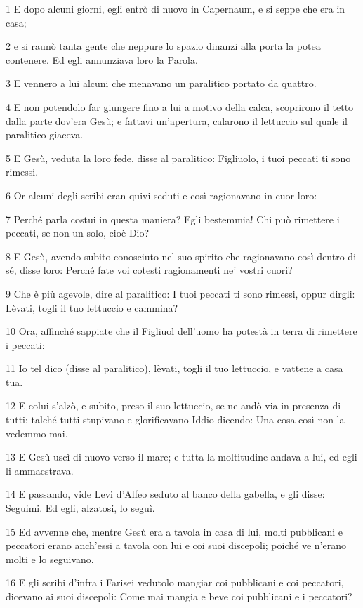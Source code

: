 \par 1 E dopo alcuni giorni, egli entrò di nuovo in Capernaum, e si seppe che era in casa;
\par 2 e si raunò tanta gente che neppure lo spazio dinanzi alla porta la potea contenere. Ed egli annunziava loro la Parola.
\par 3 E vennero a lui alcuni che menavano un paralitico portato da quattro.
\par 4 E non potendolo far giungere fino a lui a motivo della calca, scoprirono il tetto dalla parte dov'era Gesù; e fattavi un'apertura, calarono il lettuccio sul quale il paralitico giaceva.
\par 5 E Gesù, veduta la loro fede, disse al paralitico: Figliuolo, i tuoi peccati ti sono rimessi.
\par 6 Or alcuni degli scribi eran quivi seduti e così ragionavano in cuor loro:
\par 7 Perché parla costui in questa maniera? Egli bestemmia! Chi può rimettere i peccati, se non un solo, cioè Dio?
\par 8 E Gesù, avendo subito conosciuto nel suo spirito che ragionavano così dentro di sé, disse loro: Perché fate voi cotesti ragionamenti ne' vostri cuori?
\par 9 Che è più agevole, dire al paralitico: I tuoi peccati ti sono rimessi, oppur dirgli: Lèvati, togli il tuo lettuccio e cammina?
\par 10 Ora, affinché sappiate che il Figliuol dell'uomo ha potestà in terra di rimettere i peccati:
\par 11 Io tel dico (disse al paralitico), lèvati, togli il tuo lettuccio, e vattene a casa tua.
\par 12 E colui s'alzò, e subito, preso il suo lettuccio, se ne andò via in presenza di tutti; talché tutti stupivano e glorificavano Iddio dicendo: Una cosa così non la vedemmo mai.
\par 13 E Gesù uscì di nuovo verso il mare; e tutta la moltitudine andava a lui, ed egli li ammaestrava.
\par 14 E passando, vide Levi d'Alfeo seduto al banco della gabella, e gli disse: Seguimi. Ed egli, alzatosi, lo seguì.
\par 15 Ed avvenne che, mentre Gesù era a tavola in casa di lui, molti pubblicani e peccatori erano anch'essi a tavola con lui e coi suoi discepoli; poiché ve n'erano molti e lo seguivano.
\par 16 E gli scribi d'infra i Farisei vedutolo mangiar coi pubblicani e coi peccatori, dicevano ai suoi discepoli: Come mai mangia e beve coi pubblicani e i peccatori?
